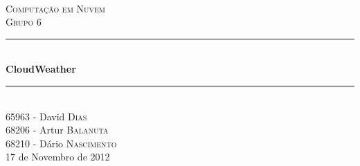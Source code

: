 \documentclass[11pt, a4paper, oneside]{Thesis} %
\title{\ttitle} %
\begin{document}
\frontmatter %


\fancyhead{} %
\rhead{\thepage} %
\lhead{} %

\pagestyle{fancy} %

\newcommand{\HRule}{\rule{\linewidth}{0.5mm}} %


\begin{titlepage}
\begin{center}

\textsc{\LARGE \univname}\\[2cm] %
\textsc{\Large Computação em Nuvem }\\[0.5cm] %
\textsc{\large Grupo 6 }\\[1cm] %


\HRule \\[0.4cm] %
{\huge \bfseries CloudWeather }\\[0.4cm] %
\HRule \\[1.5cm] %
 
 \Large 
 65963 - David \textsc{Dias}\\[0.5cm] 
 68206 - Artur \textsc{Balanuta}\\[0.5cm] 
68210 - Dário \textsc{Nascimento}\\[8cm] 


\Large 17 de Novembro de 2012\\[3cm] 

\vfill
\end{center}

\end{titlepage}
\end{document}
